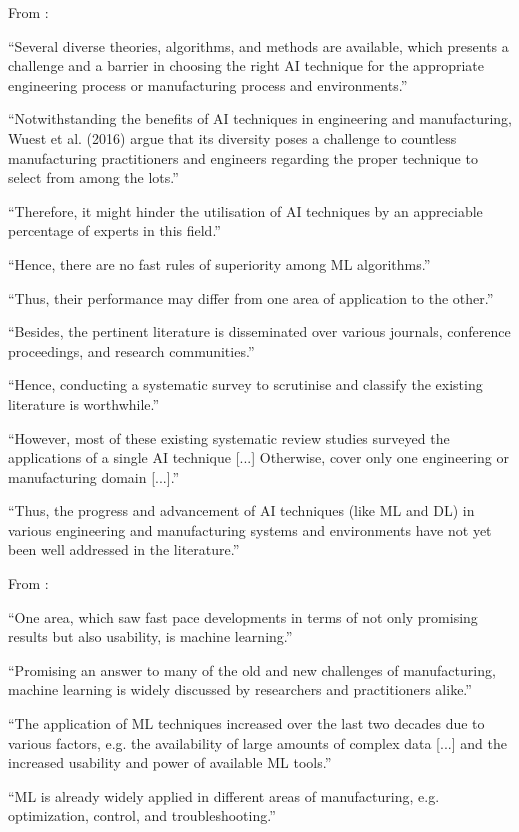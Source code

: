From \parencite{adekoya2022applications_ai_em} :

“Several diverse theories, algorithms, and methods are available, which presents a challenge and a barrier in choosing the right AI technique for the appropriate engineering process or manufacturing process and environments.”

“Notwithstanding the benefits of AI techniques in engineering and manufacturing, Wuest et al. (2016) argue that its diversity poses a challenge to countless manufacturing practitioners and engineers regarding the proper technique to select from among the lots.”

“Therefore, it might hinder the utilisation of AI techniques by an appreciable percentage of experts in this field.”

“Hence, there are no fast rules of superiority among ML algorithms.”

“Thus, their performance may differ from one area of application to the other.”

“Besides, the pertinent literature is disseminated over various journals, conference proceedings, and research communities.”

“Hence, conducting a systematic survey to scrutinise and classify the existing literature is worthwhile.”

“However, most of these existing systematic review studies surveyed the applications of a single AI technique [...] Otherwise, cover only one engineering or manufacturing domain [...].”

“Thus, the progress and advancement of AI techniques (like ML and DL) in various engineering and manufacturing systems and environments have not yet been well addressed in the literature.”


From \parencite{wuest2016ml_manufacturing} :

“One area, which saw fast pace developments in terms of not only promising results but also usability, is machine learning.”

“Promising an answer to many of the old and new challenges of manufacturing, machine learning is widely discussed by researchers and practitioners alike.”

“The application of ML techniques increased over the last two decades due to various factors, e.g. the availability of large amounts of complex data [...] and the increased usability and power of available ML tools.”

“ML is already widely applied in different areas of manufacturing, e.g. optimization, control, and troubleshooting.”

